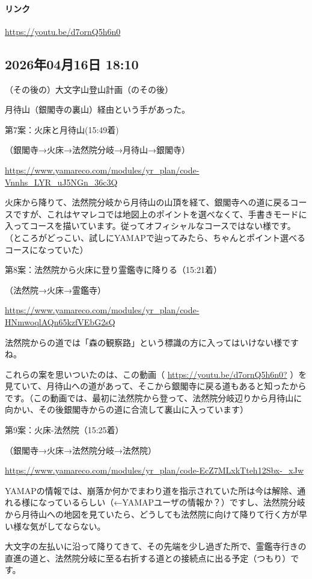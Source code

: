 \paragraph{リンク}
\url{https://youtu.be/d7ornQ5h6n0}

\subsection*{2026年04月16日 18:10}

（その後の）大文字山登山計画（のその後）

月待山（銀閣寺の裏山）経由という手があった。

第7案：火床と月待山(15:49着)

（銀閣寺→火床→法然院分岐→月待山→銀閣寺）

\url{https://www.yamareco.com/modules/yr_plan/code-Vnnhs_LYR_uJ5NGn_36c3Q}

火床から降りて、法然院分岐から月待山の山頂を経て、銀閣寺への道に戻るコースですが、これはヤマレコでは地図上のポイントを選べなくて、手書きモードに入ってコースを描いています。従ってオフィシャルなコースではない様です。（ところがどっこい、試しにYAMAPで辿ってみたら、ちゃんとポイント選べるコースになっていた）

第8案：法然院から火床に登り霊鑑寺に降りる（15:21着）

（法然院→火床→霊鑑寺）

\url{https://www.yamareco.com/modules/yr_plan/code-HNmwoqlAQn65kzfVEbG2sQ}

法然院からの道では「森の観察路」という標識の方に入ってはいけない様ですね。

これらの案を思いついたのは、この動画（ \url{https://youtu.be/d7ornQ5h6n0?} ）を見ていて、月待山への道があって、そこから銀閣寺に戻る道もあると知ったからです。（この動画では、最初に法然院から登って、法然院分岐辺りから月待山に向かい、その後銀閣寺からの道に合流して裏山に入っています）

第9案：火床-法然院（15:25着）

（銀閣寺→火床→法然院分岐→法然院）

\url{https://www.yamareco.com/modules/yr_plan/code-EcZ7MLxkTteh12Sbx-_xJw}

YAMAPの情報では、崩落か何かでまわり道を指示されていた所は今は解除、通れる様になっているらしい（←YAMAPユーザの情報か？）ですし、法然院分岐から月待山への地図を見ていたら、どうしても法然院に向けて降りて行く方が早い様な気がしてならない。

大文字の左払いに沿って降りてきて、その先端を少し過ぎた所で、霊鑑寺行きの直進の道と、法然院分岐に至る右折する道との接続点に出る予定（つもり）です。

